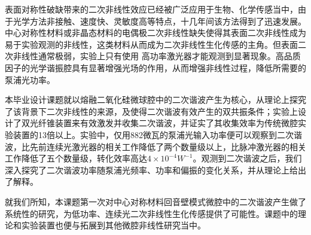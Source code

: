 \begin{cabstract}
表面对称性破缺带来的二次非线性效应已经被广泛应用于生物、化学传感当中，由于光学方法非接触、速度快、灵敏度高等特点，十几年间该方法得到了迅速发展。中心对称性材料或非晶态材料的电偶极二次非线性缺失使得其表面二次非线性成为易于实验观测的非线性，这类材料从而成为二次非线性生化传感的主角。但表面二次非线性通常极弱，实验上只有使用 高功率激光器才能观测到显著现象。高品质因子的光学谐振腔具有显著增强光场的作用，从而增强非线性过程，降低所需要的泵浦光功率。

本毕业设计课题就以熔融二氧化硅微球腔中的二次谐波产生为核心，从理论上探究了该背景下二次非线性的来源，及使得二次谐波有效产生的双共振条件；实验上设计了双光纤锥装置来有效激发并收集二次谐波，并证实了其收集效率为传统微腔实验装置的13倍以上。实验中，仅用882微瓦的泵浦光输入功率便可以观察到二次谐波，比先前连续光激光器的相关工作降低了两个数量级以上，比脉冲激光器的相关工作降低了五个数量级，转化效率高达$4\times10^{-4}W^{-1}$。观测到二次谐波之后，我们深入探究了二次谐波功率随泵浦光频率、功率和偏振的变化关系，并从理论上给出了解释。

就我们所知，本课题第一次对中心对称材料回音壁模式微腔中的二次谐波产生做了系统性的研究，为低功率、连续光二次非线性生化传感提供了可能性。课题中的理论和实验装置也便与拓展到其他微腔非线性研究当中。


\end{cabstract}


